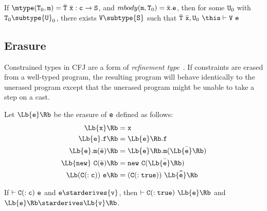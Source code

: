 \begin{lemma}
If $\mtype({\tt T}_0,{\tt m})=\bar{\tt T}\ \bar{\tt x} : {\tt c}
\rightarrow {\tt S}$, and $mbody({\tt m}, {\tt T}_0)=\bar{\tt x}.{\tt
e}$, then for some ${\tt U}_0$ with ${\tt T}_0 \subtype {\tt U}_0$,
there exists ${\tt V}\subtype {\tt S}$ such that
$\bar{\tt T}\ \bar{\tt x},{\tt U}_0\ \this \vdash {\tt V}\ {\tt e}$
\end{lemma}


\subsection{Erasure}

Constrained types in CFJ are a form of {\em refinement
type}~\cite{refinement-types}.  If constraints are erased from a
well-typed program,
the resulting program will behave identically to the unerased
program except that the unerased program might be unable to take
a step on a cast.

Let $\Lb {\tt e} \Rb$ be the erasure of ${\tt e}$ defined as follows:
\begin{align*}
\Lb {\tt x} \Rb &= {\tt x} \\
\Lb {\tt e}.{\tt f} \Rb &= \Lb {\tt e} \Rb.{\tt f} \\
\Lb {\tt e}.{\tt m}(\bar{\tt e}) \Rb &= \Lb {\tt e} \Rb.{\tt m}(\bar{\Lb {\tt e} \Rb}) \\
\Lb {\tt new}~{\tt C}(\bar{\tt e}) \Rb &= {\tt new}~{\tt C}(\bar{\Lb {\tt e} \Rb}) \\
\Lb ({\tt C}(:{\tt c}))~{\tt e} \Rb &= (\tt C(: {\tt true}))~\bar{\Lb {\tt e} \Rb}
\end{align*}

\begin{theorem}[Erasure]

If $\vdash {\tt C}(:{\tt c})\ {\tt e}$ and ${\tt e} \starderives {\tt v}$,
then $\vdash {\tt C}(:{\tt true})\ \Lb {\tt e} \Rb$ and $\Lb
{\tt e} \Rb \starderives \Lb {\tt v} \Rb$.

\end{theorem}


